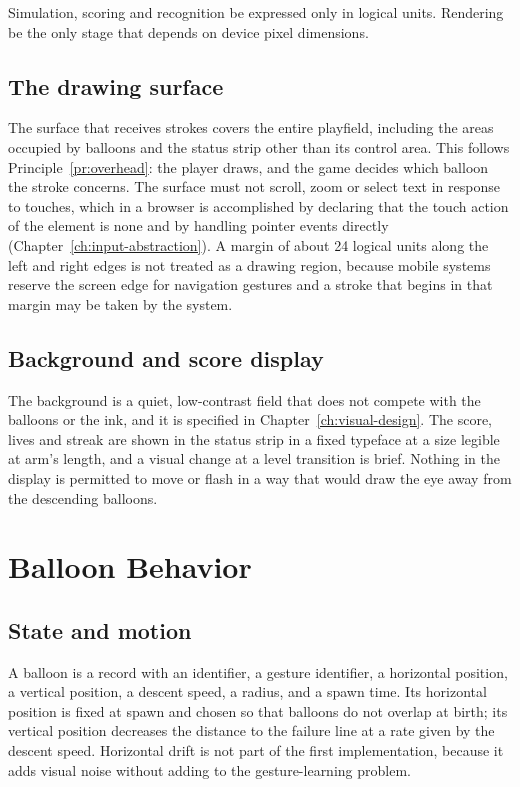\begin{requirement}\label{req:logical}
Simulation, scoring and recognition \must{} be expressed only in logical units. Rendering \must{} be the only stage that depends on device pixel dimensions.\evS
\end{requirement}

\section{The drawing surface}

The surface that receives strokes covers the entire playfield, including the areas occupied by balloons and the status strip other than its control area. This follows Principle~\ref{pr:overhead}: the player draws, and the game decides which balloon the stroke concerns. The surface must not scroll, zoom or select text in response to touches, which in a browser is accomplished by declaring that the touch action of the element is none and by handling pointer events directly (Chapter~\ref{ch:input-abstraction}). A margin of about 24 logical units along the left and right edges is not treated as a drawing region, because mobile systems reserve the screen edge for navigation gestures and a stroke that begins in that margin may be taken by the system.\evS

\section{Background and score display}

The background is a quiet, low-contrast field that does not compete with the balloons or the ink, and it is specified in Chapter~\ref{ch:visual-design}. The score, lives and streak are shown in the status strip in a fixed typeface at a size legible at arm's length, and a visual change at a level transition is brief. Nothing in the display is permitted to move or flash in a way that would draw the eye away from the descending balloons.

\chapter{Balloon Behavior}\label{ch:balloons}

\section{State and motion}

A balloon is a record with an identifier, a gesture identifier, a horizontal position, a vertical position, a descent speed, a radius, and a spawn time. Its horizontal position is fixed at spawn and chosen so that balloons do not overlap at birth; its vertical position decreases the distance to the failure line at a rate given by the descent speed. Horizontal drift is not part of the first implementation, because it adds visual noise without adding to the gesture-learning problem.


